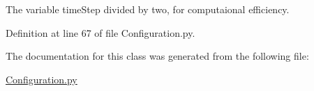 The variable time\+Step divided by two, for computaional efficiency. 



Definition at line 67 of file Configuration.\+py.



The documentation for this class was generated from the following file\+:\begin{DoxyCompactItemize}
\item 
\hyperlink{_configuration_8py}{Configuration.\+py}\end{DoxyCompactItemize}

